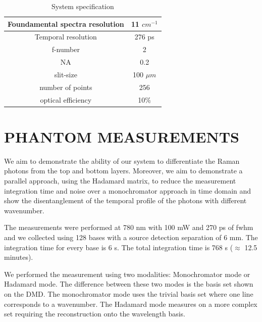 \documentclass{osa-article}
\begin{document}
\begin{table}
    \centering
    \begin{tabular}{|c|c|}
        \hline
        Foundamental spectra resolution & 11 $cm^{-1}$ \\\hline
        Temporal resolution & 276 ps \\\hline
        f-number & 2 \\\hline
        NA & 0.2 \\\hline
        slit-size & 100 $\mu m$ \\\hline
        number of points & 256 \\\hline
        optical efficiency & 10\% \\
        \hline
    \end{tabular}
    \caption{System specification}
    \label{tab:sys_spec}
\end{table}


\section{PHANTOM MEASUREMENTS}
We aim to demonstrate the ability of our system to differentiate the Raman photons from the top and bottom layers. 
Moreover, we aim to demonstrate a parallel approach, using the Hadamard matrix, to reduce the measurement integration time and noise over a monochromator approach in time domain and show the disentanglement of the temporal profile of the photons with different wavenumber.

The measurements were performed at 780 nm with 100 mW and 270 ps of fwhm and we collected using 128 bases with a source detection separation of 6 mm.
The integration time for every base is 6 s. The total integration time is  768 s ($\approx$ 12.5 minutes).

We performed the measurement using two modalities: Monochromator mode or Hadamard mode. The difference between these two modes is the basis set shown on the DMD.
The monochromator mode uses the trivial basis set where one line corresponds to a wavenumber. The Hadamard mode measures on a more complex set requiring the reconstruction onto the wavelength basis.
\end{document}

